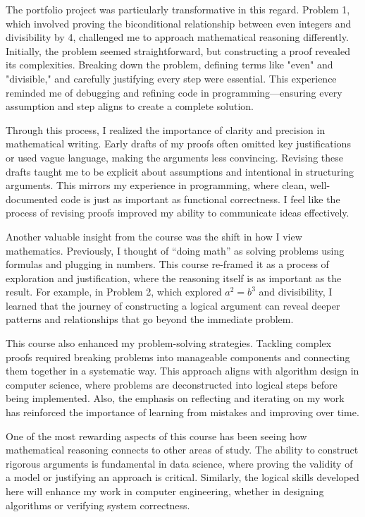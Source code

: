 \documentclass[12pt]{article}
\theoremstyle{definition}
\begin{document}
The portfolio project was particularly transformative in this regard. Problem 1, which involved proving the biconditional relationship between even integers and divisibility by 4, challenged me to approach mathematical reasoning differently. Initially, the problem seemed straightforward, but constructing a proof revealed its complexities. Breaking down the problem, defining terms like "even" and "divisible," and carefully justifying every step were essential. This experience reminded me of debugging and refining code in programming—ensuring every assumption and step aligns to create a complete solution.

Through this process, I realized the importance of clarity and precision in mathematical writing. Early drafts of my proofs often omitted key justifications or used vague language, making the arguments less convincing. Revising these drafts taught me to be explicit about assumptions and intentional in structuring arguments. This mirrors my experience in programming, where clean, well-documented code is just as important as functional correctness. I feel like the process of revising proofs improved my ability to communicate ideas effectively.

Another valuable insight from the course was the shift in how I view mathematics. Previously, I thought of “doing math” as solving problems using formulas and plugging in numbers. This course re-framed it as a process of exploration and justification, where the reasoning itself is as important as the result. For example, in Problem 2, which explored $a^2=b^3$ and divisibility, I learned that the journey of constructing a logical argument can reveal deeper patterns and relationships that go beyond the immediate problem.

This course also enhanced my problem-solving strategies. Tackling complex proofs required breaking problems into manageable components and connecting them together in a systematic way. This approach aligns with algorithm design in computer science, where problems are deconstructed into logical steps before being implemented. Also, the emphasis on reflecting and iterating on my work has reinforced the importance of learning from mistakes and improving over time.

One of the most rewarding aspects of this course has been seeing how mathematical reasoning connects to other areas of study. The ability to construct rigorous arguments is fundamental in data science, where proving the validity of a model or justifying an approach is critical. Similarly, the logical skills developed here will enhance my work in computer engineering, whether in designing algorithms or verifying system correctness.
\end{document}
